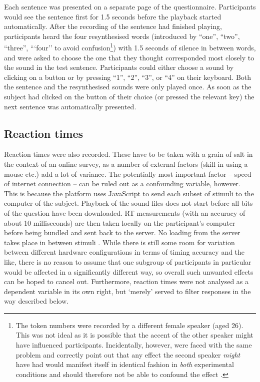 \largerpage
Each sentence was presented on a separate page of the questionnaire.
Participants would see the sentence first for 1.5 seconds before the playback started automatically.
After the recording of the sentence had finished playing, participants heard the four resynthesised words (introduced by ``one'', ``two'', ``three'', ```four'' to avoid confusion\footnote{The token numbers were recorded by a different female speaker (aged 26). This was not ideal as it is possible that the accent of the other speaker might have influenced participants. Incidentally, however, \citeauthor{haydrager2010} were faced with the same problem and correctly point out that any effect the second speaker \emph{might} have had would manifest itself in identical fashion in \emph{both} experimental conditions and should therefore not be able to confound the  effect \parencite[cf.][871 and 889]{haydrager2010}.}) with 1.5 seconds of silence in between words, and were asked to choose the one that they thought corresponded most closely to the sound in the test sentence.
Participants could either choose a sound by clicking on a button or by pressing ``1'', ``2'', ``3'', or ``4'' on their keyboard.
Both the sentence and the resynthesised sounds were only played once.
As soon as the subject had clicked on the button of their choice (or pressed the relevant key) the next sentence was automatically presented.

\subsection{Reaction times}
\label{sec.perc_method.pres.rt}

Reaction times were also recorded.
These have to be taken with a grain of salt in the context of an online survey, as a number of external factors (skill in using a mouse etc.) add a lot of variance.
The potentially most important factor -- speed of internet connection -- can be ruled out as a confounding variable, however.
This is because the platform uses JavaScript to send each subset of stimuli to the computer of the subject.
Playback of the sound files does not start before all bits of the question have been downloaded.
RT measurements (with an accuracy of about 10 milliseconds) are then taken locally on the participant's computer before being bundled and sent back to the server.
No loading from the server takes place in between stimuli \parencite[cf.][]{sosci}.
While there is still some room for variation between different hardware configurations in terms of timing accuracy and the like, there is no reason to assume that one subgroup of participants in particular would be affected in a significantly different way, so overall such unwanted effects can be hoped to cancel out.
Furthermore, reaction times were not analysed as a dependent variable in its own right, but `merely' served to filter responses in the way described below.

